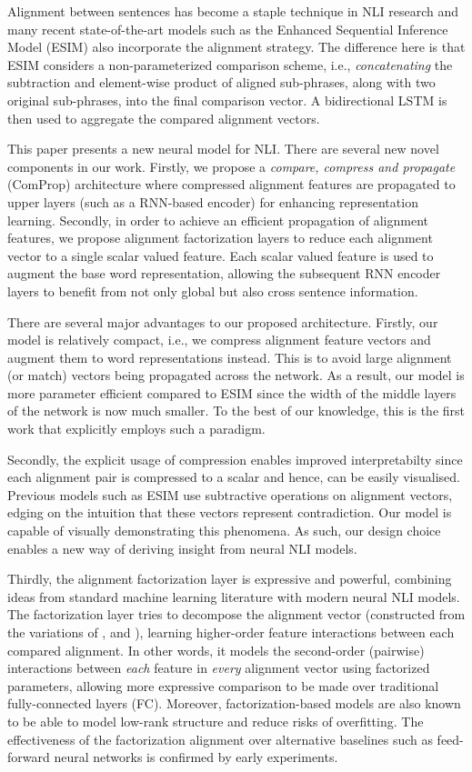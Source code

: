 \documentclass[11pt,a4paper]{article}
\begin{document}
Alignment between sentences has become a staple technique in NLI research and many recent state-of-the-art models such as the Enhanced Sequential Inference Model (ESIM) \cite{DBLP:conf/acl/ChenZLWJI17} also incorporate the alignment strategy. The difference here is that ESIM considers a non-parameterized comparison scheme, i.e., \textit{concatenating} the subtraction and element-wise product of aligned sub-phrases, along with two original sub-phrases, into the final comparison vector. A bidirectional LSTM is then used to aggregate the compared alignment vectors.

This paper presents a new neural model for NLI. There are several new novel components in our work. Firstly, we propose a \textit{compare, compress and propagate} (ComProp) architecture where compressed alignment features are propagated to upper layers (such as a RNN-based encoder) for enhancing representation learning. Secondly, in order to achieve an efficient propagation of alignment features, we propose alignment factorization layers to reduce each alignment vector to a single scalar valued feature. Each scalar valued feature is used to augment the base word representation, allowing the subsequent RNN encoder layers to benefit from not only global but also cross sentence information.

There are several major advantages to our proposed architecture. Firstly, our model is relatively compact, i.e., we compress alignment feature vectors and augment them to word representations instead. This is to avoid large alignment (or match) vectors being propagated across the network. As a result, our model is more parameter efficient compared to ESIM since the width of the middle layers of the network is now much smaller. To the best of our knowledge, this is the first work that explicitly employs such a paradigm.

Secondly, the explicit usage of compression enables improved interpretabilty since each alignment pair is compressed to a scalar and hence, can be easily visualised. Previous models such as ESIM use subtractive operations on alignment vectors, edging on the intuition that these vectors represent contradiction. Our model is capable of visually demonstrating this phenomena. As such, our design choice enables a new way of deriving insight from neural NLI models.

Thirdly, the alignment factorization layer is expressive and powerful, combining ideas from standard machine learning literature \cite{rendle2010factorization} with modern neural NLI models. The factorization layer tries to decompose the alignment vector (constructed from the variations of ,  and ), learning higher-order feature interactions between each compared alignment. In other words, it models the second-order (pairwise) interactions between \textit{each} feature in \textit{every} alignment vector using factorized parameters, allowing more expressive comparison to be made over traditional fully-connected layers (FC). Moreover, factorization-based models are also known to be able to model low-rank structure and reduce risks of overfitting. The effectiveness of the factorization alignment over alternative baselines such as feed-forward neural networks is confirmed by early experiments.
\end{document}
